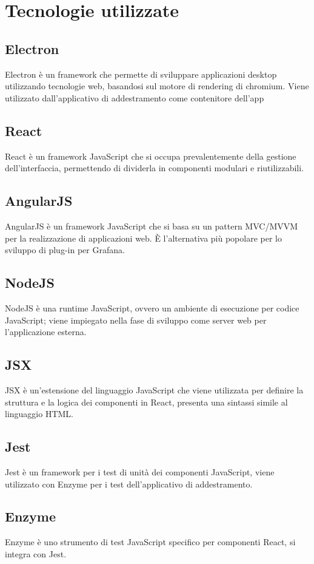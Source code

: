 \section{Tecnologie utilizzate}
	\subsection{Electron}
		Electron è un framework che permette di sviluppare applicazioni desktop utilizzando tecnologie web, basandosi sul motore di rendering di chromium. Viene utilizzato dall'applicativo di addestramento come contenitore dell'app
	\subsection{React}
		React è un framework JavaScript che si occupa prevalentemente della gestione dell'interfaccia, permettendo di dividerla in componenti modulari e riutilizzabili.
	\subsection{AngularJS}
		AngularJS è un framework JavaScript che si basa su un pattern MVC/MVVM per la realizzazione di applicazioni web. È l'alternativa più popolare per lo sviluppo di plug-in per Grafana\glo.
	\subsection{NodeJS}
		NodeJS è una runtime JavaScript, ovvero un ambiente di esecuzione per codice JavaScript; viene impiegato nella fase di sviluppo come server web per l'applicazione esterna.
	\subsection{JSX}
		JSX è un'estensione del linguaggio JavaScript che viene utilizzata per definire la struttura e la logica dei componenti in React, presenta una sintassi simile al linguaggio HTML.
	\subsection{Jest}
		Jest è un framework per i test di unità dei componenti JavaScript, viene utilizzato con Enzyme per i test dell'applicativo di addestramento.
	\subsection{Enzyme}
		Enzyme è uno strumento di test JavaScript specifico per componenti React, si integra con Jest.
